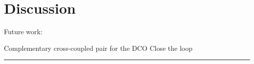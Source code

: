 \chapter{Discussion}
Future work:

Complementary cross-coupled pair for the DCO 
Close the loop


\noindent\rule{\textwidth}{1pt}
